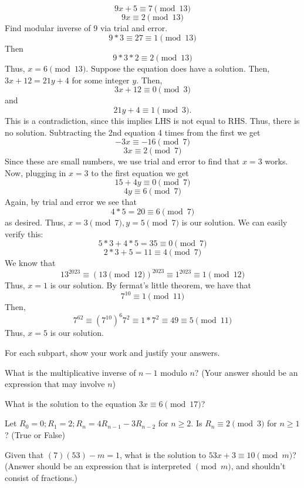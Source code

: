 \documentclass[11pt]{article}
\begin{document}
\begin{solution}
\begin{Parts}
\Part 
$$9x+5 \equiv 7 \pmod{13}$$
$$9x \equiv 2 \pmod{13}$$
Find modular inverse of 9 via trial and error.
$$9*3 \equiv 27 \equiv 1 \pmod{13}$$
Then
$$9*3*2 \equiv 2 \pmod{13}$$
Thus, $x=6\pmod{13}$.
\Part
Suppose the equation does have a solution.
Then, $3x+12 = 21y+4$ for some integer $y$.
Then,
$$3x+12\equiv 0\pmod{3}$$
and
$$21y+4\equiv 1\pmod{3}.$$
This is a contradiction, since this implies LHS is not equal to RHS.
Thus, there is no solution.
\Part
Subtracting the 2nd equation 4 times from the first we get
$$-3x\equiv -16\pmod{7}$$
$$3x\equiv 2\pmod{7}$$
Since these are small numbers, we use trial and error to find that
$x=3$ works.
Now, plugging in $x=3$ to the first equation we get
$$15+4y\equiv 0\pmod{7}$$
$$4y\equiv 6\pmod{7}$$
Again, by trial and error we see that 
$$4*5=20\equiv 6\pmod{7}$$
as desired.
Thus, $x=3\pmod{7},y=5\pmod{7}$ is our solution.
We can easily verify this: 
$$5*3+4*5=35\equiv 0\pmod{7}$$
$$2*3+5=11\equiv 4\pmod{7}$$
\Part 
We know that
$$13^{2023}\equiv (13\pmod{12})^{2023}\equiv 1^{2023}\equiv 1\pmod{12}$$
Thus, $x=1$ is our solution.
\Part 
By fermat's little theorem, we have that 
$$7^{10}\equiv 1\pmod{11}$$
Then,
$$7^{62}\equiv (7^{10})^6 7^2\equiv 1*7^2\equiv 49\equiv 5\pmod{11}$$
Thus, $x=5$ is our solution.
\end{Parts}
\end{solution}
\newpage


For each subpart, show your work and justify your answers.

\begin{Parts}
\Part
What is the multiplicative inverse of $n-1$ modulo $n$? (Your answer should be an expression
that may involve $n$)

\Part
What is the solution to the equation $3x \equiv 6 \pmod{17}$?

\Part
Let $R_0 = 0; R_1 = 2; R_n = 4R_{n-1} - 3R_{n-2}$ for $n \geq 2$.
Is $R_n \equiv 2 \pmod{3}$ for $n \geq 1$? (True or False)

\Part
Given that $(7)(53) - m = 1$,
what is the solution to $53x +3 \equiv 10 \pmod m$?  (Answer should be an
expression that is interpreted $\pmod m$, and shouldn't consist of
fractions.)

\end{Parts}
\end{document}
